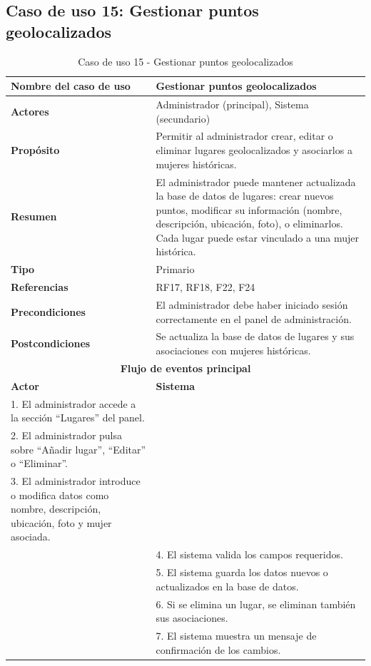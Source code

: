 \subsection{Caso de uso 15: Gestionar puntos geolocalizados}

\begin{table}[H]
\centering
\caption{Caso de uso 15 - Gestionar puntos geolocalizados}
\begin{tabular}{|p{4.5cm}|p{10.5cm}|}
\hline
\textbf{Nombre del caso de uso} & Gestionar puntos geolocalizados \\
\hline
\textbf{Actores} & Administrador (principal), Sistema (secundario) \\
\hline
\textbf{Propósito} & Permitir al administrador crear, editar o eliminar lugares geolocalizados y asociarlos a mujeres históricas. \\
\hline
\textbf{Resumen} & El administrador puede mantener actualizada la base de datos de lugares: crear nuevos puntos, modificar su información (nombre, descripción, ubicación, foto), o eliminarlos. Cada lugar puede estar vinculado a una mujer histórica. \\
\hline
\textbf{Tipo} & Primario \\
\hline
\textbf{Referencias} & RF17, RF18, F22, F24 \\
\hline
\textbf{Precondiciones} & El administrador debe haber iniciado sesión correctamente en el panel de administración. \\
\hline
\textbf{Postcondiciones} & Se actualiza la base de datos de lugares y sus asociaciones con mujeres históricas. \\
\hline
\multicolumn{2}{|c|}{\textbf{Flujo de eventos principal}} \\
\hline
\textbf{Actor} & \textbf{Sistema} \\
\hline
1. El administrador accede a la sección “Lugares” del panel. & \\
\hline
2. El administrador pulsa sobre “Añadir lugar”, “Editar” o “Eliminar”. & \\
\hline
3. El administrador introduce o modifica datos como nombre, descripción, ubicación, foto y mujer asociada. & \\
\hline
& 4. El sistema valida los campos requeridos. \\
\hline
& 5. El sistema guarda los datos nuevos o actualizados en la base de datos. \\
\hline
& 6. Si se elimina un lugar, se eliminan también sus asociaciones. \\
\hline
& 7. El sistema muestra un mensaje de confirmación de los cambios. \\
\hline
\end{tabular}
\end{table}

